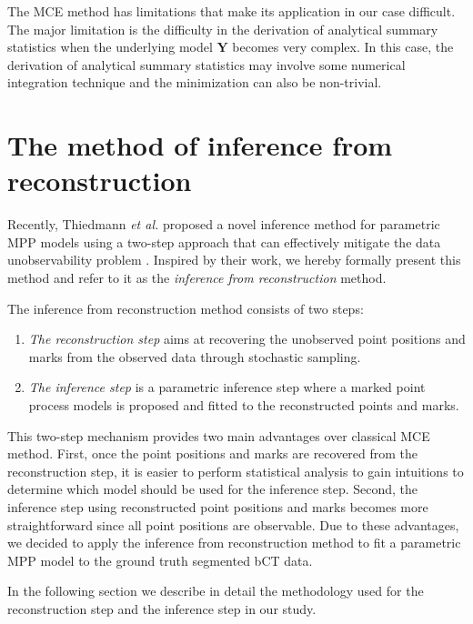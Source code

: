\documentclass[journal]{IEEEtran}
\begin{document}
The MCE method has limitations that make its application in our case
difficult. The major limitation is the difficulty in the derivation of
analytical summary statistics when the underlying model $\mathbf{Y}$
becomes very complex. In this case, the derivation of analytical
summary statistics may involve some numerical integration technique
and the minimization can also be non-trivial.

\section{The method of inference from reconstruction }
\label{sec:meth-infer-from}

Recently, Thiedmann \textit{et al.} proposed a novel inference method
for parametric MPP models using a two-step approach that can
effectively mitigate the data unobservability problem
\cite{thiedmann2011stochastic}. Inspired by their work, we hereby
formally present this method and refer to it as the \textit{inference
  from reconstruction} method.

The inference from reconstruction method consists of two steps:

\begin{enumerate}[leftmargin=*,noitemsep]
\item \textit{The reconstruction step} aims at recovering the
  unobserved point positions and marks from the observed data through
  stochastic sampling.
\item \textit{The inference step} is a parametric inference step where
  a marked point process models is proposed and fitted to the
  reconstructed points and marks.
\end{enumerate}

This two-step mechanism provides two main advantages over classical
MCE method. First, once the point positions and marks are recovered
from the reconstruction step, it is easier to perform statistical
analysis to gain intuitions to determine which model should be used
for the inference step. Second, the inference step using reconstructed
point positions and marks becomes more straightforward since all point
positions are observable. Due to these advantages, we decided to apply
the inference from reconstruction method to fit a parametric MPP model
to the ground truth segmented bCT data.

In the following section we describe in detail the methodology used
for the reconstruction step and the inference step in our study.
\end{document}
